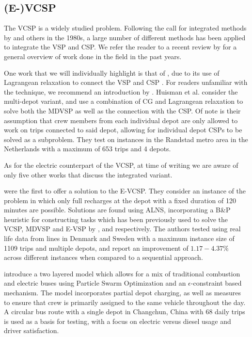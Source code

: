 \documentclass[]{article}
\begin{document}
\subsection{(E-)VCSP}
The VCSP is a widely studied problem. Following the call for integrated methods by \citet{Bodin1983} and others in the 1980s, a large number of different methods has been applied to integrate the VSP and CSP. We refer the reader to a recent review by \citet{Ge2024} for a general overview of work done in the field in the past years.

One work that we will individually highlight is that of \citet{Huisman2005}, due to its use of Lagrangean relaxation to connect the VSP and CSP . For readers unfamiliar with the technique, we recommend an introduction by \citet{Beasley1993}. Huisman et al. consider the multi-depot variant, and use a combination of CG and Lagrangean relaxation to solve both the MDVSP as well as the connection with the CSP. Of note is their assumption that crew members from each individual depot are only allowed to work on trips connected to said depot, allowing for individual depot CSPs to be solved as a subproblem. They test on instances in the Randstad metro area in the Netherlands with a maximum of 653 trips and 4 depots.


As for the electric counterpart of the VCSP, at time of writing we are aware of only five other works that discuss the integrated variant.

\citet{Perumal2021} were the first to offer a solution to the E-VCSP. They consider an instance of the problem in which only full recharges at the depot with a fixed duration of 120 minutes are possible. Solutions are found using ALNS, incorporating a B\&P heuristic for constructing tasks which has been previously used to solve the VCSP, MDVSP and E-VSP by \citet{Haase1996}, \citet{Pepin2009} and
\citet{ vanKootenNiekerk2017} respectively. The authors tested using real life data from lines in Denmark and Sweden with a
maximum instance size of 1109 trips and multiple depots, and report an improvement of $1.17-4.37\%$
across different instances when compared to a sequential approach.

\citet{Wang2022} introduce a two layered model which allows for a mix of traditional combustion and electric buses using Particle Swarm Optimization and an $\epsilon$-constraint based mechanism. The model incorporates partial depot charging, as well as measures to ensure that crew is primarily assigned to the same vehicle throughout the day. A circular bus route with a single depot in Changchun, China with 68 daily trips is used as a basis for testing, with a focus on electric versus diesel usage and driver satisfaction.
\end{document}

